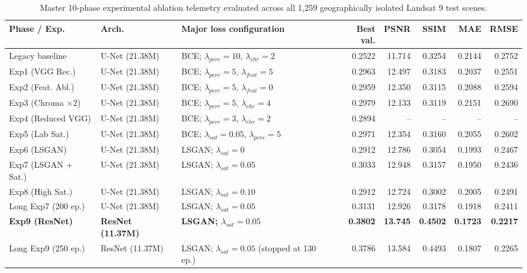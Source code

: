 \documentclass[10pt,a4paper,twoside]{article}
\begin{document}
\begin{table}[htbp]
    \caption{Master 10-phase experimental ablation telemetry evaluated across all 1,259 geographically isolated Landsat 9 test scenes.}
    \label{tab:ablation}
    \centering
    \scriptsize
    \setlength{\tabcolsep}{2.6pt}
    \begin{tabularx}{\textwidth}{@{}>{\raggedright\arraybackslash}p{1.5cm}>{\centering\arraybackslash}p{1.25cm}>{\raggedright\arraybackslash}Xrrrrr@{}}
        \toprule
        \textbf{Phase / Exp.} & \textbf{Arch.} & \textbf{Major loss configuration} & \textbf{Best val.} & \textbf{PSNR} & \textbf{SSIM} & \textbf{MAE} & \textbf{RMSE} \\
        \midrule
        Legacy baseline & U-Net (21.38M) & BCE; $\lambda_{perc}=10$, $\lambda_{chr}=2$ & 0.2522 & 11.714 & 0.3254 & 0.2144 & 0.2752 \\
        Exp1 (VGG Rec.) & U-Net (21.38M) & BCE; $\lambda_{perc}=5$, $\lambda_{feat}=5$ & 0.2963 & 12.497 & 0.3183 & 0.2037 & 0.2551 \\
        Exp2 (Feat. Abl.) & U-Net (21.38M) & BCE; $\lambda_{perc}=5$, $\lambda_{feat}=0$ & 0.2959 & 12.350 & 0.3115 & 0.2088 & 0.2594 \\
        Exp3 (Chroma $\times 2$) & U-Net (21.38M) & BCE; $\lambda_{perc}=5$, $\lambda_{chr}=4$ & 0.2979 & 12.133 & 0.3119 & 0.2151 & 0.2690 \\
        Exp4 (Reduced VGG) & U-Net (21.38M) & BCE; $\lambda_{perc}=3$, $\lambda_{chr}=2$ & 0.2894 & -- & -- & -- & -- \\
        Exp5 (Lab Sat.) & U-Net (21.38M) & BCE; $\lambda_{sat}=0.05$, $\lambda_{perc}=5$ & 0.2971 & 12.354 & 0.3160 & 0.2055 & 0.2602 \\
        Exp6 (LSGAN) & U-Net (21.38M) & LSGAN; $\lambda_{sat}=0$ & 0.2912 & 12.786 & 0.3054 & 0.1993 & 0.2467 \\
        Exp7 (LSGAN + Sat.) & U-Net (21.38M) & LSGAN; $\lambda_{sat}=0.05$ & 0.3033 & 12.948 & 0.3157 & 0.1950 & 0.2436 \\
        Exp8 (High Sat.) & U-Net (21.38M) & LSGAN; $\lambda_{sat}=0.10$ & 0.2912 & 12.724 & 0.3002 & 0.2005 & 0.2491 \\
        Long Exp7 (200 ep.) & U-Net (21.38M) & LSGAN; $\lambda_{sat}=0.05$ & 0.3131 & 12.926 & 0.3178 & 0.1918 & 0.2411 \\
        \textbf{Exp9 (ResNet)} & \textbf{ResNet (11.37M)} & \textbf{LSGAN; $\lambda_{sat}=0.05$} & \textbf{0.3802} & \textbf{13.745} & \textbf{0.4502} & \textbf{0.1723} & \textbf{0.2217} \\
        Long Exp9 (250 ep.) & ResNet (11.37M) & LSGAN; $\lambda_{sat}=0.05$ (stopped at 130 ep.) & 0.3786 & 13.584 & 0.4493 & 0.1807 & 0.2265 \\
        \bottomrule
    \end{tabularx}
\end{table}
\end{document}
